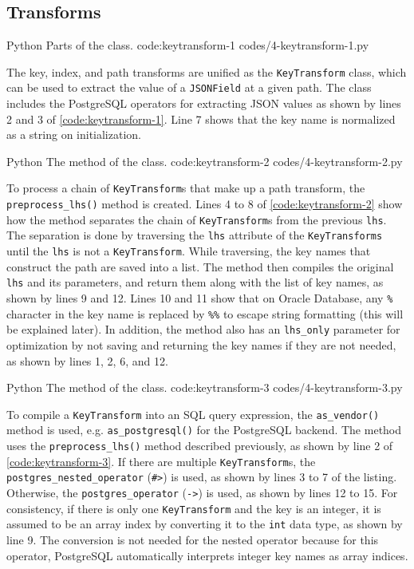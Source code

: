 \subsection{ Transforms}

\listing
{Python}
{Parts of the  class.}
{code:keytransform-1}
{codes/4-keytransform-1.py}

The key, index, and path
transforms are unified as the \verb|KeyTransform| class, which can be used to
extract the value of a \verb|JSONField| at a given path. The class includes the
{PostgreSQL} operators for extracting JSON values as shown by lines 2 and 3
of \autoref{code:keytransform-1}. Line 7 shows that the key name is normalized
as a string on initialization.

\listing
{Python}
{The  method of the  class.}
{code:keytransform-2}
{codes/4-keytransform-2.py}

To process a chain of \verb|KeyTransform|s that make up a path transform, the
\verb|preprocess_lhs()| method is created. Lines 4 to 8 of
\autoref{code:keytransform-2} show how the method separates the chain of
\verb|KeyTransform|s from the previous \verb|lhs|. The separation is done by
traversing the \verb|lhs| attribute of the \verb|KeyTransforms| until the
\verb|lhs| is not a \verb|KeyTransform|. While traversing, the key names that
construct the path are saved into a list. The method then compiles the original
\verb|lhs| and its parameters, and return them along with the list of key
names, as shown by lines 9 and 12. Lines 10 and 11 show that on Oracle
Database, any \verb|%| character in the key name is replaced by
\verb|%%| to escape string formatting (this will be explained later). In
addition, the method also has an \verb|lhs_only| parameter for optimization by
not saving and returning the key names if they are not needed, as shown by
lines 1, 2, 6, and 12.

\listing
{Python}
{The  method of the  class.}
{code:keytransform-3}
{codes/4-keytransform-3.py}

To compile a \verb|KeyTransform| into an SQL query expression, the
\verb|as_vendor()| method is used, e.g. \verb|as_postgresql()| for the
PostgreSQL backend. The method uses the \verb|preprocess_lhs()| method
described previously, as shown by line 2 of \autoref{code:keytransform-3}. If
there are multiple \verb|KeyTransform|s, the \verb|postgres_nested_operator|
(\verb|#>|) is used, as shown by lines 3 to 7 of the listing. Otherwise, the
\verb|postgres_operator| (\verb|->|) is used, as shown by lines 12 to 15. For
consistency, if there is only one \verb|KeyTransform| and the key is an
integer, it is assumed to be an array index by converting it to the \verb|int|
data type, as shown by line 9. The conversion is not needed for the nested
operator because for this operator, PostgreSQL automatically interprets integer
key names as array indices.

